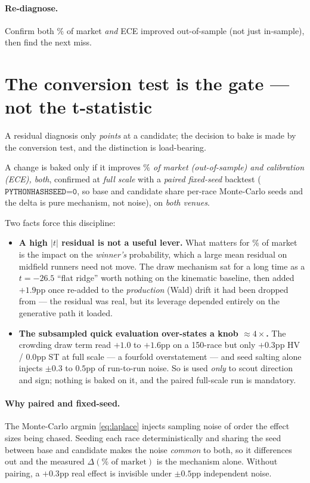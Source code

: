 \paragraph{Re-diagnose.} Confirm both $\%$ of market \emph{and} ECE improved out-of-sample (not
just in-sample), then find the next miss.

\section{The conversion test is the gate --- not the t-statistic}

A residual diagnosis only \emph{points} at a candidate; the decision to bake is made by the
conversion test, and the distinction is load-bearing.

\begin{principle}
A change is baked only if it improves \emph{$\%$ of market (out-of-sample) and calibration (ECE),
both}, confirmed at \emph{full scale} with a \emph{paired fixed-seed} backtest
($\texttt{PYTHONHASHSEED=0}$, so base and candidate share per-race Monte-Carlo seeds and the delta
is pure mechanism, not noise), on \emph{both venues}.
\end{principle}

Two facts force this discipline:
\begin{itemize}
  \item \textbf{A high $|t|$ residual is not a useful lever.} What matters for $\%$ of market is the
        impact on the \emph{winner's} probability, which a large mean residual on midfield runners
        need not move. The draw mechanism sat for a long time as a $t=-26.5$ ``flat ridge'' worth
        nothing on the kinematic baseline, then added $+1.9$pp once re-added to the \emph{production}
        (Wald) drift it had been dropped from --- the residual was real, but its leverage depended
        entirely on the generative path it loaded.
  \item \textbf{The subsampled quick evaluation over-states a knob $\approx 4\times$.} The crowding
        draw term read $+1.0$ to $+1.6$pp on a 150-race  but only $+0.3$pp HV /
        $0.0$pp ST at full scale --- a fourfold overstatement --- and seed salting alone injects
        $\pm 0.3$ to $0.5$pp of run-to-run noise. So  is used \emph{only} to scout
        direction and sign; nothing is baked on it, and the paired full-scale run is mandatory.
\end{itemize}

\paragraph{Why paired and fixed-seed.} The Monte-Carlo argmin \eqref{eq:laplace} injects sampling
noise of order the effect sizes being chased. Seeding each race deterministically and sharing the
seed between base and candidate makes the noise \emph{common} to both, so it differences out and the
measured $\Delta(\%\text{ of market})$ is the mechanism alone. Without pairing, a $+0.3$pp real
effect is invisible under $\pm 0.5$pp independent noise.

